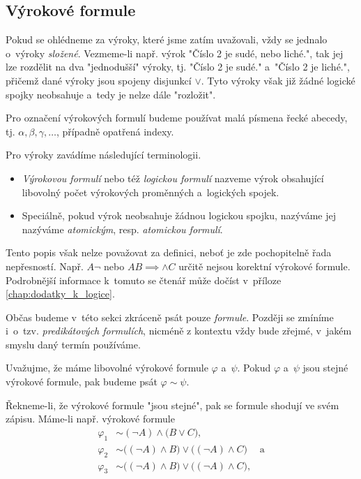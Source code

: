 \subsection{Výrokové formule}
Pokud se ohlédneme za výroky, které jsme zatím uvažovali, vždy se jednalo o~výroky \emph{složené}. Vezmeme-li např. výrok "Číslo 2 je sudé, nebo liché.", tak jej lze rozdělit na dva "jednodušší" výroky, tj. "Číslo 2 je sudé." a~"Číslo 2 je liché.", přičemž dané výroky jsou spojeny disjunkcí $\lor$. Tyto výroky však již žádné logické spojky neobsahuje a~tedy je nelze dále "rozložit".
\begin{convention}
    Pro označení výrokových formulí budeme používat malá písmena řecké abecedy, tj. $\alpha,\beta,\gamma,\dots$, případně opatřená indexy.
\end{convention}
Pro výroky zavádíme následující terminologii.
\begin{itemize}
    \item \emph{Výrokovou formulí} nebo též \emph{logickou formulí} nazveme výrok obsahující libovolný počet výrokových proměnných a~logických spojek.
    \item Speciálně, pokud výrok neobsahuje žádnou logickou spojku, nazýváme jej nazýváme \emph{atomickým}, resp. \emph{atomickou formulí}.
\end{itemize}
Tento popis však nelze považovat za definici, neboť je zde pochopitelně řada nepřesností. Např. $A\neg$ nebo $AB\implies\land C$ určitě nejsou korektní výrokové formule. Podrobnější informace k~tomuto se čtenář může dočíst v~příloze \ref{chap:dodatky_k_logice}.
\begin{remark}
    Občas budeme v~této sekci zkráceně psát pouze \emph{formule}. Později se zmíníme i~o~tzv. \emph{predikátových formulích}, nicméně z kontextu vždy bude zřejmé, v~jakém smyslu daný termín používáme.
\end{remark}
\begin{convention}
    \label{conv:rovnost_logickych_formuli}
    Uvažujme, že máme libovolné výrokové formule $\varphi$ a~$\psi$. Pokud $\varphi$ a~$\psi$ jsou stejné výrokové formule, pak budeme psát $\varphi\sim\psi$.
\end{convention}
Řekneme-li, že výrokové formule "jsou stejné", pak se formule shodují ve svém zápisu. Máme-li např. výrokové formule
\begin{align*}
    \varphi_1&\sim (\neg A) \land \bigl(B \lor C\bigr),\\
    \varphi_2&\sim \bigl((\neg A) \land B\bigr) \lor \bigl((\neg A) \land C\bigr)\;\quad\text{a}\\
    \varphi_3&\sim \bigl((\neg A) \land B\bigr) \lor \bigl((\neg A) \land C\bigr),
\end{align*}
